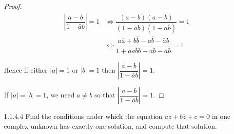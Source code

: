 \begin{proof}
	\begingroup
	\allowdisplaybreaks%
	\begin{align*}
		\left\vert \dfrac{a - b}{1 - \bar{a}b} \right\vert = 1 & \iff \dfrac{(a - b)\overline{(a - b)}}{(1 - \bar{a}b)(1 - a\bar{b})} = 1                               \\
		                                                       & \iff \dfrac{a\bar{a} + b\bar{b} - a\bar{b} - \bar{a}b}{1 + a\bar{a}b\bar{b} - a\bar{b} - \bar{a}b} = 1
	\end{align*}
	\endgroup

	Hence if either \( \left\vert a \right\vert = 1 \) or \( \left\vert b \right\vert = 1 \) then \( \left\vert \dfrac{a - b}{1 - \bar{a}b} \right\vert = 1 \).

	If \( \left\vert a \right\vert = \left\vert b \right\vert = 1 \), we need \( a \ne b \) so that \( \left\vert \dfrac{a - b}{1 - \bar{a}b} \right\vert = 1 \).
\end{proof}

\begin{problem}{1.1.4.4}
Find the conditions under which the equation \( az + b\bar{z} + c = 0 \) in one complex unknown has exactly one solution, and compute that solution.
\end{problem}

